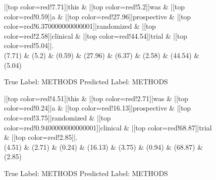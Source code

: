 \documentclass[a4paper, landscape]{article}
\begin{document}
\clearpage
\begin{figure}
\begin{center}
\begin{dependency}
\begin{deptext}
|[top color=red!7.71]|this \& |[top color=red!5.2]|was \& |[top color=red!0.59]|a \& |[top color=red!27.96]|prospective \& |[top color=red!6.370000000000001]|randomized \& |[top color=red!2.58]|clinical \& |[top color=red!44.54]|trial \& |[top color=red!5.04]|.\\
(7.71) \& (5.2) \& (0.59) \& (27.96) \& (6.37) \& (2.58) \& (44.54) \& (5.04)\\
\end{deptext}
\end{dependency}
\end{center}
\caption{True Label: METHODS Predicted Label: METHODS}
\end{figure}
\clearpage
\begin{figure}
\begin{center}
\begin{dependency}
\begin{deptext}
|[top color=red!4.51]|this \& |[top color=red!2.71]|was \& |[top color=red!0.24]|a \& |[top color=red!16.13]|prospective \& |[top color=red!3.75]|randomized \& |[top color=red!0.9400000000000001]|clinical \& |[top color=red!68.87]|trial \& |[top color=red!2.85]|.\\
(4.51) \& (2.71) \& (0.24) \& (16.13) \& (3.75) \& (0.94) \& (68.87) \& (2.85)\\
\end{deptext}
\end{dependency}
\end{center}
\caption{True Label: METHODS Predicted Label: METHODS}
\end{figure}
\clearpage
\end{document}
